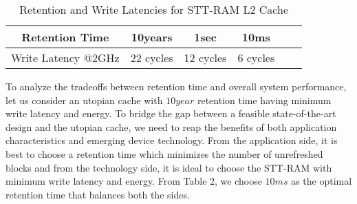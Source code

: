 

\begin{table*}[t]
  \centering
  \caption{Retention and Write Latencies for STT-RAM L2 Cache}
  \label{table:rt-wt}
  \begin{tabular}{| c | c | c | c | c | c |}
    \hline
     Retention Time & 10years & 1sec &10ms \\
    \hline
    Write Latency @2GHz & 22 cycles & 12 cycles & 6 cycles \\
    \hline
  \end{tabular}
\end{table*}

To analyze the tradeoffs between retention time and overall system performance, let us consider an utopian cache
with $10year$ retention time having minimum write latency and energy.  To bridge the gap between a
feasible state-of-the-art design and the utopian cache, we need to reap the benefits of both application
characteristics and emerging device technology. From the application side, it is best to choose a retention time
which minimizes the number of unrefreshed blocks and from the technology side, it is ideal to choose the
STT-RAM with minimum write latency and energy. From Table 2, we choose $10ms$ as the optimal retention time that
balances both the sides.
